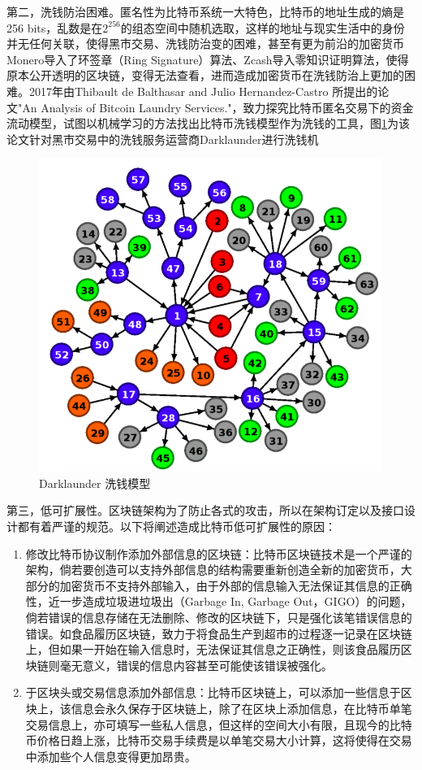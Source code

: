 				第二，洗钱防治困难。匿名性为比特币系统一大特色，比特币的地址生成的熵是256 bits，乱数是在$2^{256}$的组态空间中随机选取，这样的地址与现实生活中的身份并无任何关联，使得黑市交易、洗钱防治变的困难，甚至有更为前沿的加密货币Monero\supercite{noether2014monero}导入了环签章（Ring Signature）\supercite{Thresholdringsignaturesandapplicationstoad-hocgroups}算法、Zcash\supercite{zhong2002faster}导入零知识证明算法\supercite{Zero-KnowledgeProofsofIdentity}，使得原本公开透明的区块链，变得无法查看，进而造成加密货币在洗钱防治上更加的困难。2017年由Thibault de Balthasar and Julio Hernandez-Castro 所提出的论文"An Analysis of Bitcoin Laundry Services."\supercite{AnAnalysisofBitcoinLaundryServices}，致⼒探究⽐特币匿名交易下的资⾦流动模型，试图以机械学习的方法找出比特币洗钱模型作为洗钱的工具，图\ref{Darklaunderworkflow}为该论文针对黑市交易中的洗钱服务运营商Darklaunder进行洗钱机
					\begin{figure}[!htb]
						\centering
						\includegraphics[width = .6\textwidth]{Darklaunderworkflow.png}
						\caption{Darklaunder 洗钱模型\supercite{AnAnalysisofBitcoinLaundryServices}}\label{Darklaunderworkflow}
					\end{figure}

				第三，低可扩展性。区块链架构为了防止各式的攻击，所以在架构订定以及接口设计都有着严谨的规范。以下将阐述造成比特币低可扩展性的原因：

					\begin{enumerate}

						\item 修改比特币协议制作添加外部信息的区块链：比特币区块链技术是一个严谨的架构，倘若要创造可以支持外部信息的结构需要重新创造全新的加密货币，大部分的加密货币不支持外部输入，由于外部的信息输⼊无法保证其信息的正确性，近一步造成垃圾进垃圾出（Garbage In, Garbage Out，GIGO）的问题，倘若错误的信息存储在无法删除、修改的区块链下，只是强化该笔错误信息的错误。如食品履历区块链，致力于将食品生产到超市的过程逐一记录在区块链上，但如果一开始在输入信息时，无法保证其信息之正确性，则该食品履历区块链则毫无意义，错误的信息内容甚至可能使该错误被强化。

						\item 于区块头或交易信息添加外部信息：比特币区块链上，可以添加一些信息于区块上，该信息会永久保存于区块链上，除了在区块上添加信息，在比特币单笔交易信息上，亦可填写一些私人信息，但这样的空间大小有限，且现今的比特币价格日趋上涨，比特币交易手续费是以单笔交易大小计算，这将使得在交易中添加些个人信息变得更加昂贵。

					\end{enumerate}

